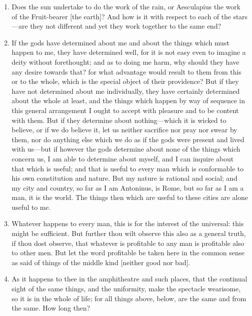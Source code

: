 \begin{enumerate}
\item Does the sun undertake to do the work of the rain, or Aesculapius the work of the Fruit-bearer [{\clarify the earth}]? And how is it with respect to each of the stars—are they not different and yet they work together to the same end?

\item If the gods have determined about me and about the things which must happen to me, they have determined well, for it is not easy even to imagine a deity without forethought; and as to doing me harm, why should they have any desire towards that? for what advantage would result to them from this or to the whole, which is the special object of their providence? But if they have not determined about me individually, they have certainly determined about the whole at least, and the things which happen by way of sequence in this general arrangement I ought to accept with pleasure and to be content with them. But if they determine about nothing—which it is wicked to believe, or if we do believe it, let us neither sacrifice nor pray nor swear by them, nor do anything else which we do as if the gods were present and lived with us—but if however the gods determine about none of the things which concern us, I am able to determine about myself, and I can inquire about that which is useful; and that is useful to every man which is conformable to his own constitution and nature. But my nature is rational and social; and my city and country, so far as I am Antoninus, is Rome, but so far as I am a man, it is the world. The things then which are useful to these cities are alone useful to me.

\item Whatever happens to every man, this is for the interest of the universal: this might be sufficient. But further thou wilt observe this also as a general truth, if thou dost observe, that whatever is profitable to any man is profitable also to other men. But let the word profitable be taken here in the common sense as said of things of the middle kind [{\clarify neither good nor bad}].

\item As it happens to thee in the amphitheatre and such places, that the continual sight of the same things, and the uniformity, make the spectacle wearisome, so it is in the whole of life; for all things above, below, are the same and from the same. How long then?


\end{enumerate}
